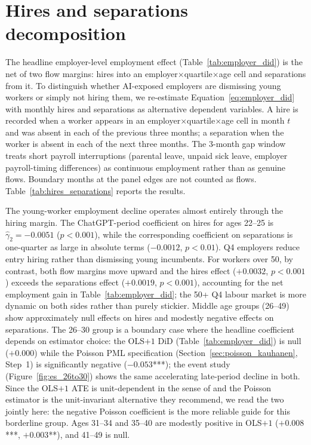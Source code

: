 \documentclass[preprint,12pt,authoryear]{elsarticle}
\begin{document}
\section{Hires and separations decomposition}
\label{sec:hires_separations}

The headline employer-level employment effect (Table~\ref{tab:employer_did}) is the net of two flow margins: hires into an employer$\times$quartile$\times$age cell and separations from it. To distinguish whether AI-exposed employers are dismissing young workers or simply not hiring them, we re-estimate Equation~\eqref{eq:employer_did} with monthly hires and separations as alternative dependent variables. A hire is recorded when a worker appears in an employer$\times$quartile$\times$age cell in month $t$ and was absent in each of the previous three months; a separation when the worker is absent in each of the next three months. The 3-month gap window treats short payroll interruptions (parental leave, unpaid sick leave, employer payroll-timing differences) as continuous employment rather than as genuine flows. Boundary months at the panel edges are not counted as flows. Table~\ref{tab:hires_separations} reports the results.

The young-worker employment decline operates almost entirely through the hiring margin. The ChatGPT-period coefficient on hires for ages 22--25 is $\hat\gamma_2 = -0.0051$ ($p < 0.001$), while the corresponding coefficient on separations is one-quarter as large in absolute terms ($-0.0012$, $p < 0.01$). Q4 employers reduce entry hiring rather than dismissing young incumbents. For workers over 50, by contrast, both flow margins move upward and the hires effect ($+0.0032$, $p < 0.001$) exceeds the separations effect ($+0.0019$, $p < 0.001$), accounting for the net employment gain in Table~\ref{tab:employer_did}; the 50+ Q4 labour market is more dynamic on both sides rather than purely stickier. Middle age groups (26--49) show approximately null effects on hires and modestly negative effects on separations. The 26--30 group is a boundary case where the headline coefficient depends on estimator choice: the OLS$+1$ DiD (Table~\ref{tab:employer_did}) is null ($+0.000$) while the Poisson PML specification (Section~\ref{sec:poisson_kauhanen}, Step~1) is significantly negative ($-0.053$***); the event study (Figure~\ref{fig:es_26to30}) shows the same accelerating late-period decline in both. Since the OLS$+1$ ATE is unit-dependent in the sense of \citet{chen2024logs} and the Poisson estimator is the unit-invariant alternative they recommend, we read the two jointly here: the negative Poisson coefficient is the more reliable guide for this borderline group. Ages 31--34 and 35--40 are modestly positive in OLS$+1$ ($+0.008$***, $+0.003$**), and 41--49 is null.
\end{document}

